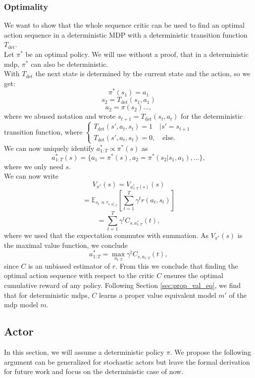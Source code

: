 \subsubsection{Optimality}
We want to show that the whole sequence critic can be used to find an optimal action sequence in a deterministic MDP with a deterministic transition function $T_{\text{det}}$.\\
Let $\pi^*$ be an optimal policy. We will use without a proof, that in a deterministic \ac{mdp}, $\pi^*$ can also be deterministic.\\
With $T_{\text{det}}$ the next state is determined by the current state and the action, so we get:
$$\pi^*(s_1) = a_1$$
$$s_2 = T_{\text{det}}(s_1, a_1)$$
$$a_2 = \pi(s_2) ..., $$
where we abused notation and wrote $s_{t+1} = T_{\text{det}}(s_t, a_t)$ for the deterministic transition function, where 
$\begin{cases}
    T_{\text{det}}(s', a_t, s_t) = 1\quad | s' = s_{t+1}\\
    T_{\text{det}}(s', a_t, s_t) = 0, \quad \text{else}.
\end{cases}$\\

We can now uniquely identify $a^*_{1:T} \propto \pi^*(s)$ as 
$$a^*_{1:T}(s) = \{a_1 = \pi^*(s) , a_2 = \pi^*(s_2|s_1,a_1), ... \},$$
where we only need $s$. \\
We can now write 
$$V_{\pi^*}(s) = V_{a^*_{1:T}(s)}(s)$$
$$=\mathbb{E}_{s_t \propto \tau_{s, a^*_{1:T}}}\left[\sum_{t=1}^T \gamma^t r(a_t, s_t)\right]$$
$$=\sum_{t=1}^T \gamma^t C_{s, a^*_{1:T}}(t),$$
where we used that the expectation commutes with summation. As $V_{\pi^*}(s)$ is the maximal value function, we conclude 
$$a^*_{1:T} = \max_{a_{1:T}}\gamma^t C_{s, a_{1:T}}(t),$$
since $C$ is an unbiased estimator of $r$. From this we conclude that finding the optimal action sequence with respect to the critic $C$ ensures the optimal 
cumulative reward of any policy. Following Section \ref{sec:prop_val_eq}, we find that for deterministic \ac{mdp}s, $C$ learns a proper value equivalent model $m'$ of the \ac{mdp} model $m$.

\subsection{Actor}
\label{sec:AC_actor}
In this section, we will assume a deterministic policy $\pi$. We propose the following argument can be generalized for stochastic actors but 
leave the formal derivation for future work and focus on the deterministic case of now.\\

